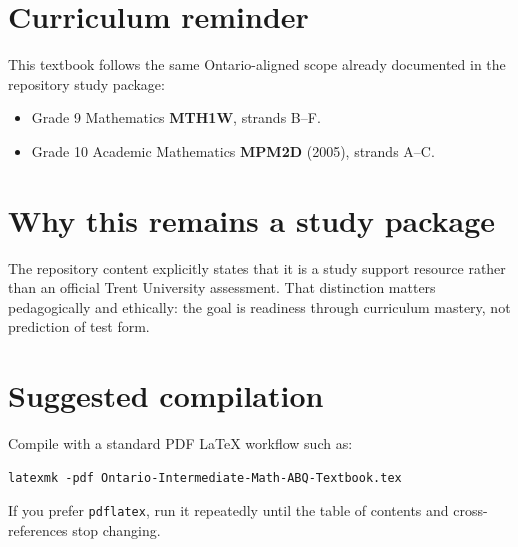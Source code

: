\documentclass[11pt,oneside]{book}
\newcommand{\coursecode}[1]{\textbf{#1}}
\begin{document}
\section*{Curriculum reminder}
This textbook follows the same Ontario-aligned scope already documented in the repository study package:
\begin{itemize}
  \item Grade 9 Mathematics \coursecode{MTH1W}, strands B--F.
  \item Grade 10 Academic Mathematics \coursecode{MPM2D} (2005), strands A--C.
\end{itemize}

\section*{Why this remains a study package}
The repository content explicitly states that it is a study support resource rather than an official Trent University assessment. That distinction matters pedagogically and ethically: the goal is readiness through curriculum mastery, not prediction of test form.

\section*{Suggested compilation}
Compile with a standard PDF LaTeX workflow such as:
\begin{verbatim}
latexmk -pdf Ontario-Intermediate-Math-ABQ-Textbook.tex
\end{verbatim}
If you prefer \texttt{pdflatex}, run it repeatedly until the table of contents and cross-references stop changing.
\end{document}
